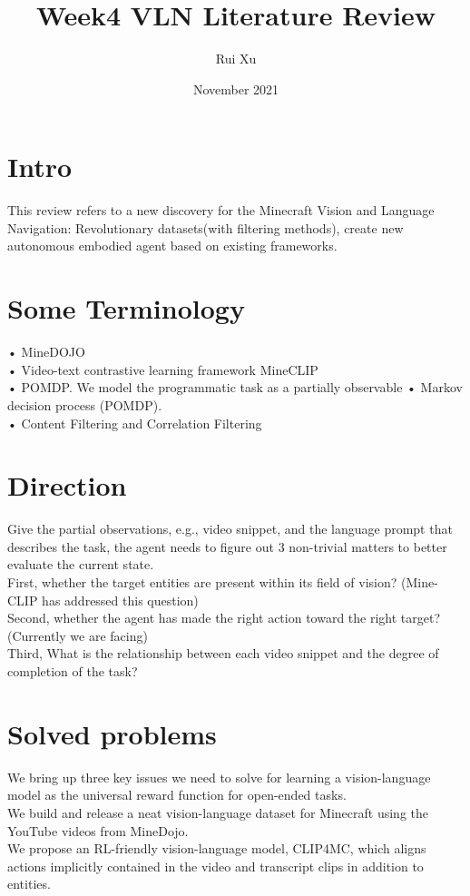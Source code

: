 \documentclass{article}
\title{Week4 VLN Literature Review }
\author{Rui Xu}
\date{November 2021}
\begin{document}
\maketitle
\section{Intro}
This review refers to a new discovery for the Minecraft Vision and Language Navigation: Revolutionary datasets(with filtering methods), create new autonomous embodied agent based on existing frameworks.

\section{Some Terminology}
    • MineDOJO\\
    • Video-text contrastive learning framework MineCLIP\\
    • POMDP. We model the programmatic task as a partially observable  •    Markov decision process (POMDP).\\
    • Content Filtering and Correlation Filtering\\
    
\section{Direction}
Give the partial observations, e.g., video snippet, and the language prompt that describes the task, the agent needs to figure out 3 non-trivial matters to better evaluate the current state. \\
First, whether the target entities are present within its field of vision?
(Mine-CLIP has addressed this question)\\
Second, whether the agent has made the right action toward the right target? (Currently we are facing)\\
Third, What is the relationship between each video snippet and the degree of completion of the task?\\

\section{Solved problems}
We bring up three key issues we need to solve for learning a 
vision-language model as the universal reward function for open-ended tasks.\\
We build and release a neat vision-language dataset for Minecraft using the YouTube videos from MineDojo.\\
We propose an RL-friendly vision-language model, CLIP4MC, which aligns actions implicitly contained in the video and transcript clips in addition to entities.\\
\end{document}
